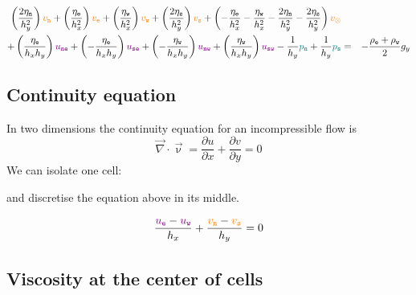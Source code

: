 \begin{mdframed}[backgroundcolor=blue!5]
\begin{eqnarray}
\left( \frac{2\eta_{\tt n}}{h_y^2} \right) {\color{orange} v_{\tt n}} +
\left( \frac{ \eta_{\tt e}}{h_x^2} \right) {\color{orange} v_{\tt e}} +
\left( \frac{ \eta_{\tt w}}{h_x^2} \right) {\color{orange} v_{\tt w}} +
\left( \frac{2\eta_{\tt s}}{h_y^2} \right) {\color{orange} v_{\tt s}} +
\left( 
-\frac{\eta_{\tt e}}{h_x^2} 
-\frac{\eta_{\tt w}}{h_x^2} 
-\frac{2\eta_{\tt n}}{h_y^2} 
-\frac{2\eta_{\tt s}}{h_y^2} 
\right) {\color{orange} v_\otimes} \nonumber\\
+
\left( \frac{\eta_{\tt e}}{h_x h_y} \right) {\color{violet} u_{\tt ne}} +
\left(-\frac{\eta_{\tt e}}{h_x h_y} \right) {\color{violet} u_{\tt se}} +
\left(-\frac{\eta_{\tt w}}{h_x h_y} \right) {\color{violet} u_{\tt nw}} +
\left( \frac{\eta_{\tt w}}{h_x h_y} \right) {\color{violet} u_{\tt sw}} 
-\frac{1}{h_y} {\color{teal}p_{\tt n}} + \frac{1}{h_y} {\color{teal}p_{\tt s}}
&=& -\frac{\rho_{\tt e}+\rho_{\tt w}}{2} g_y \nonumber\\
\label{eq:fdmstokes2}
\end{eqnarray}
\end{mdframed}


\subsection{Continuity equation}

In two dimensions the continuity equation for an incompressible flow is
\[
\vec\nabla \cdot \vec\upnu 
= 
\frac{\partial u}{\partial x} 
+
\frac{\partial v}{\partial y} 
=0
\]
We can isolate one cell:



and discretise the equation above in its middle.
\begin{mdframed}[backgroundcolor=blue!5]
\begin{equation}
\frac{{\color{violet}u_{\tt e}}-{\color{violet}u_{\tt w}}}{h_x} 
+
\frac{{\color{orange}v_{\tt n}}-{\color{orange}v_{\tt s}}}{h_y} 
=0
\label{eq:fdmstokes3}
\end{equation}
\end{mdframed}



\subsection{Viscosity at the center of cells \label{ss:fdm_stokes_visc} }

